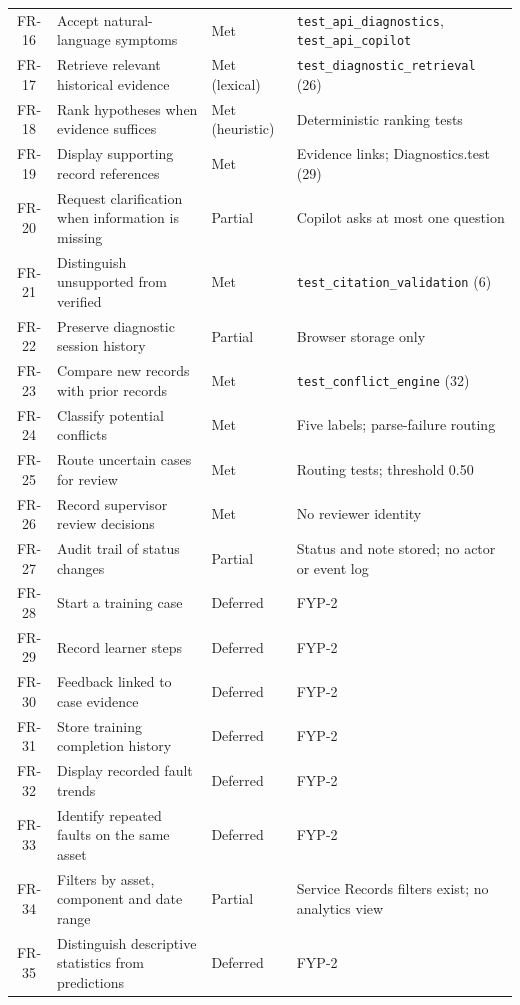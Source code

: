 \begin{longtable}{@{}c >{\raggedright\arraybackslash}p{} >{\raggedright\arraybackslash}p{} p{}@{}}
FR-16 & Accept natural-language symptoms & Met & \texttt{test\_api\_diagnostics}, \texttt{test\_api\_copilot} \\
FR-17 & Retrieve relevant historical evidence & Met (lexical) & \texttt{test\_diagnostic\_retrieval} (26) \\
FR-18 & Rank hypotheses when evidence suffices & Met (heuristic) & Deterministic ranking tests \\
FR-19 & Display supporting record references & Met & Evidence links; Diagnostics.test (29) \\
FR-20 & Request clarification when information is missing & Partial & Copilot asks at most one question \\
FR-21 & Distinguish unsupported from verified & Met & \texttt{test\_citation\_validation} (6) \\
FR-22 & Preserve diagnostic session history & Partial & Browser storage only \\
FR-23 & Compare new records with prior records & Met & \texttt{test\_conflict\_engine} (32) \\
FR-24 & Classify potential conflicts & Met & Five labels; parse-failure routing \\
FR-25 & Route uncertain cases for review & Met & Routing tests; threshold 0.50 \\
FR-26 & Record supervisor review decisions & Met & No reviewer identity \\
FR-27 & Audit trail of status changes & Partial & Status and note stored; no actor or event log \\
FR-28 & Start a training case & Deferred & FYP-2 \\
FR-29 & Record learner steps & Deferred & FYP-2 \\
FR-30 & Feedback linked to case evidence & Deferred & FYP-2 \\
FR-31 & Store training completion history & Deferred & FYP-2 \\
FR-32 & Display recorded fault trends & Deferred & FYP-2 \\
FR-33 & Identify repeated faults on the same asset & Deferred & FYP-2 \\
FR-34 & Filters by asset, component and date range & Partial & Service Records filters exist; no analytics view \\
FR-35 & Distinguish descriptive statistics from predictions & Deferred & FYP-2 \\
\end{longtable}
